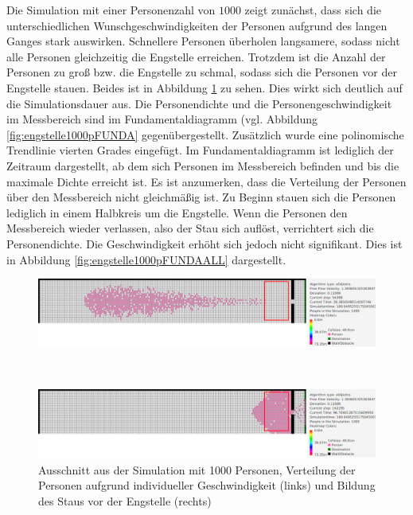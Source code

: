 Die Simulation mit einer Personenzahl von $1000$ zeigt zunächst, dass sich die unterschiedlichen Wunschgeschwindigkeiten der Personen aufgrund des langen Ganges stark auswirken. Schnellere Personen überholen langsamere, sodass nicht alle Personen gleichzeitig die Engstelle erreichen. Trotzdem ist die Anzahl der Personen zu groß bzw. die Engstelle zu schmal, sodass sich die Personen vor der Engstelle stauen. Beides ist in Abbildung \ref{fig:engstelle1000p} zu sehen. Dies wirkt sich deutlich auf die Simulationsdauer aus. Die Personendichte und die Personengeschwindigkeit im Messbereich sind im Fundamentaldiagramm (vgl. Abbildung \ref{fig:engstelle1000pFUNDA} gegenübergestellt. Zusätzlich wurde eine polinomische Trendlinie vierten Grades eingefügt. Im Fundamentaldiagramm ist lediglich der Zeitraum dargestellt, ab dem sich Personen im Messbereich befinden und bis die maximale Dichte erreicht ist. Es ist anzumerken, dass die Verteilung der Personen über den Messbereich nicht gleichmäßig ist. Zu Beginn stauen sich die Personen lediglich in einem Halbkreis um die Engstelle. Wenn die Personen den Messbereich wieder verlassen, also der Stau sich auflöst, verrichtert sich die Personendichte. Die Geschwindigkeit erhöht sich jedoch nicht signifikant. Dies ist in Abbildung \ref{fig:engstelle1000pFUNDAALL} dargestellt.

\begin{figure}
\centering
\begin{minipage}{1\textwidth}
\centering
  \includegraphics[width=1\linewidth]{abbildungen/engstelle/1000P/engstelle1000personenVORmessbereich.png}
\end{minipage}%
\\
\begin{minipage}{1\textwidth}
\centering
  \includegraphics[width=1\linewidth]{abbildungen/engstelle/1000P/engstelle1000personenMAXmessbereich.png} 
 \end{minipage}
\caption{Ausschnitt aus der Simulation mit 1000 Personen, Verteilung der Personen aufgrund individueller Geschwindigkeit (links) und Bildung des Staus vor der Engstelle (rechts)}
\label{fig:engstelle1000p}
\end{figure}

